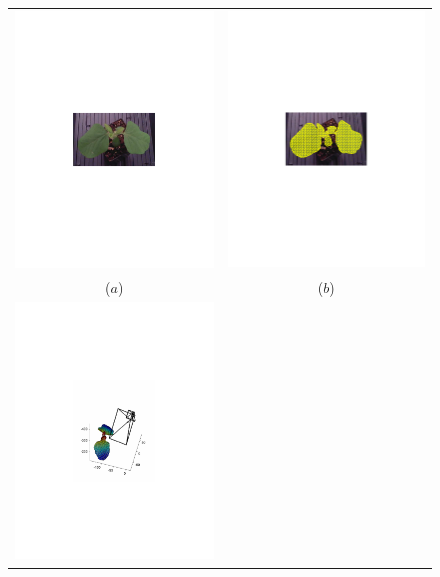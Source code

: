 \begin{figure}
\begin{center}
\begin{tabular}{cc}
\includegraphics[trim=190 280 190 290,clip,width=0.48\linewidth]{Figures/soybeanColor} &
\includegraphics[trim=190 280 190 290,clip,width=0.48\linewidth]{Figures/soybeanColorMesh} \\
($a$) & ($b$) \\
\includegraphics[trim=190 280 190 290,clip,width=0.48\linewidth]{Figures/soybean3DMeshPlusCam} &

\end{tabular}
\end{center}
\end{figure}
